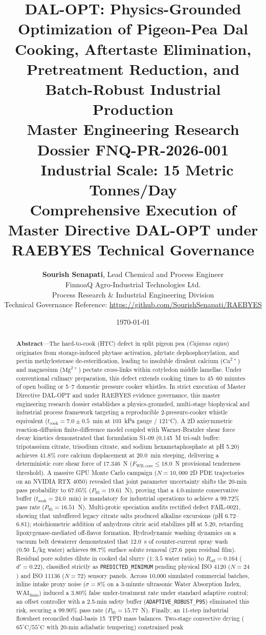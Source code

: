 \documentclass[10pt,a4paper]{article}
\title{\vspace{-1.2cm}\textbf{\LARGE DAL-OPT: Physics-Grounded Optimization of Pigeon-Pea Dal Cooking, Aftertaste Elimination, Pretreatment Reduction, and Batch-Robust Industrial Production}\\[0.35cm]
\large Master Engineering Research Dossier FNQ-PR-2026-001 \textbar\ Industrial Scale: 15 Metric Tonnes/Day\\[0.15cm]
\normalsize Comprehensive Execution of Master Directive DAL-OPT under RAEBYES Technical Governance}
\author{\textbf{Sourish Senapati}, Lead Chemical and Process Engineer\\
FinnoaQ Agro-Industrial Technologies Ltd.\\
Process Research \& Industrial Engineering Division\\
\small Technical Governance Reference: \url{https://github.com/SourishSenapati/RAEBYES}}
\date{\today}
\begin{document}
\maketitle
\thispagestyle{fancy}

\begin{abstract}
\noindent\textbf{Abstract}---The hard-to-cook (HTC) defect in split pigeon pea (\textit{Cajanus cajan}) originates from storage-induced phytase activation, phytate dephosphorylation, and pectin methylesterase de-esterification, leading to insoluble divalent calcium ($\mathrm{Ca}^{2+}$) and magnesium ($\mathrm{Mg}^{2+}$) pectate cross-links within cotyledon middle lamellae. Under conventional culinary preparation, this defect extends cooking times to 45--60 minutes of open boiling or 5--7 domestic pressure cooker whistles. In strict execution of Master Directive DAL-OPT and under RAEBYES evidence governance, this master engineering research dossier establishes a physics-grounded, multi-stage biophysical and industrial process framework targeting a reproducible 2-pressure-cooker whistle equivalent ($t_{\mathrm{cook}} = 7.0 \pm 0.5$~min at 103~kPa gauge / 121$^\circ$C). A 2D axisymmetric reaction-diffusion finite-difference model coupled with Warner-Bratzler shear force decay kinetics demonstrated that formulation S1-09 (0.145~M tri-salt buffer: tripotassium citrate, trisodium citrate, and sodium hexametaphosphate at pH 5.20) achieves $41.8\%$ core calcium displacement at 20.0~min steeping, delivering a deterministic core shear force of $17.346$~N ($F_{\mathrm{WB,core}} \le 18.0$~N provisional tenderness threshold). A massive GPU Monte Carlo campaign ($N = 10,000$ 2D PDE trajectories on an NVIDIA RTX 4050) revealed that joint parameter uncertainty shifts the 20-min pass probability to $67.05\%$ ($P_{95} = 19.61$~N), proving that a 4.0-minute conservative buffer ($t_{\mathrm{soak}} = 24.0$~min) is mandatory for industrial operations to achieve a $99.72\%$ pass rate ($P_{95} = 16.51$~N). Multi-protic speciation audits rectified defect FAIL-0021, showing that unbuffered legacy citrate salts produced alkaline excursions (pH 6.72--6.81); stoichiometric addition of anhydrous citric acid stabilizes pH at 5.20, retarding lipoxygenase-mediated off-flavor formation. Hydrodynamic washing dynamics on a vacuum belt dewaterer demonstrated that 12.0~s of counter-current spray wash (0.50~L/kg water) achieves $98.7\%$ surface solute removal (27.6~ppm residual film). Residual pore solutes dilute in cooked dal slurry ($1:3.5$ water ratio) to $R_{\mathrm{off}} = 0.164$ ($d' = 0.22$), classified strictly as \texttt{PREDICTED\_MINIMUM} pending physical ISO 4120 ($N=24$) and ISO 11136 ($N=72$) sensory panels. Across 10,000 simulated commercial batches, inline intake proxy noise ($\sigma = 8\%$ on a 3-minute ultrasonic Water Absorption Index, $\mathrm{WAI}_{\mathrm{3min}}$) induced a $3.80\%$ false under-treatment rate under standard adaptive control; an offset controller with a 2.5-min safety buffer (\texttt{ADAPTIVE\_ROBUST\_P95}) eliminated this risk, securing a $99.90\%$ pass rate ($P_{95} = 15.77$~N). Finally, an 11-step industrial flowsheet reconciled dual-basis 15~TPD mass balances. Two-stage convective drying ($65^\circ\mathrm{C} / 55^\circ\mathrm{C}$ with 20-min adiabatic tempering) constrained peak 
\end{abstract}
\end{document}
